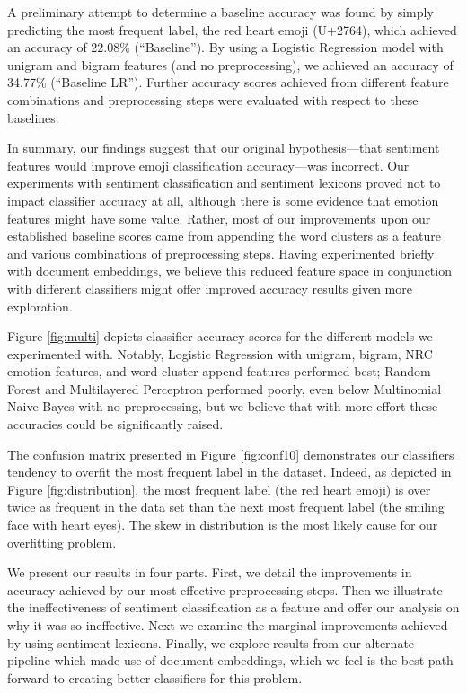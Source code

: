 \documentclass[11pt]{article}
\begin{document}
A preliminary attempt to determine a baseline accuracy was found by simply predicting the most frequent label, the red heart emoji (U+2764), which achieved an accuracy of 22.08\% (``Baseline''). By using a Logistic Regression model with unigram and bigram features (and no preprocessing), we achieved an accuracy of 34.77\% (``Baseline LR''). Further accuracy scores achieved from different feature combinations and preprocessing steps were evaluated with respect to these baselines.

In summary, our findings suggest that our original hypothesis—that sentiment features would improve emoji classification accuracy—was incorrect. Our experiments with sentiment classification and sentiment lexicons proved not to impact classifier accuracy at all, although there is some evidence that emotion features might have some value. Rather, most of our improvements upon our established baseline scores came from appending the word clusters as a feature and various combinations of preprocessing steps. Having experimented briefly with document embeddings, we believe this reduced feature space in conjunction with different classifiers might offer improved accuracy results given more exploration.

Figure \ref{fig:multi} depicts classifier accuracy scores for the different models we experimented with. Notably, Logistic Regression with unigram, bigram, NRC emotion features, and word cluster append features performed best; Random Forest and Multilayered Perceptron performed poorly, even below Multinomial Naive Bayes with no preprocessing, but we believe that with more effort these accuracies could be significantly raised.

The confusion matrix presented in Figure \ref{fig:conf10} demonstrates our classifiers tendency to overfit the most frequent label in the dataset. Indeed, as depicted in Figure \ref{fig:distribution}, the most frequent label (the red heart emoji) is over twice as frequent in the data set than the next most frequent label (the smiling face with heart eyes). The skew in distribution is the most likely cause for our overfitting problem.

We present our results in four parts. First, we detail the improvements in accuracy achieved by our most effective preprocessing steps. Then we illustrate the ineffectiveness of sentiment classification as a feature and offer our analysis on why it was so ineffective. Next we examine the marginal improvements achieved by using sentiment lexicons. Finally, we explore results from our alternate pipeline which made use of document embeddings, which we feel is the best path forward to creating better classifiers for this problem.
\end{document}
